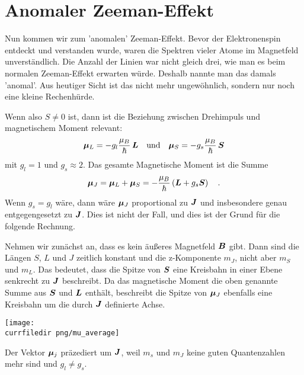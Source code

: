 \section{Anomaler Zeeman-Effekt}

Nun kommen wir zum 'anomalen' Zeeman-Effekt. Bevor der Elektronenspin entdeckt und verstanden wurde, waren die Spektren vieler Atome im Magnetfeld unverständlich. Die Anzahl der Linien war nicht gleich drei, wie man es beim normalen Zeeman-Effekt erwarten würde. Deshalb nannte man das damals 'anomal'. Aus heutiger Sicht ist das nicht mehr ungewöhnlich, sondern nur noch eine kleine Rechenhürde.

Wenn also $S \neq 0$ ist, dann ist die Beziehung zwischen Drehimpuls und magnetischem Moment relevant:
\begin{equation}
    \boldsymbol{\mu}_L = - g_l \frac{\mu_B}{\hbar} \, \boldsymbol{L} \quad \text{und} \quad  \boldsymbol{\mu}_S = - g_s \frac{\mu_B}{\hbar} \, \boldsymbol{S}
\end{equation}
mit $g_l = 1$ und $g_s \approx 2$. Das gesamte Magnetische Moment ist die Summe
\begin{equation}
    \boldsymbol{\mu}_J =  \boldsymbol{\mu}_L +  \boldsymbol{\mu}_S = - \frac{\mu_B}{\hbar} \left( \boldsymbol{L} + g_s \boldsymbol{S} \right)  \quad .
\end{equation}
Wenn $g_s = g_l$ wäre, dann wäre $\boldsymbol{\mu}_J$ proportional zu $\boldsymbol{J}$ und insbesondere genau entgegengesetzt zu $\boldsymbol{J}$. Dies ist nicht der Fall, und dies ist der Grund für die folgende Rechnung.

Nehmen wir zunächst an, dass es kein äußeres Magnetfeld $\boldsymbol{B}$ gibt. Dann sind die Längen $S$, $L$ und $J$ zeitlich konstant und die z-Komponente  $m_J$, nicht aber $m_S$ und $m_L$. Das bedeutet, dass die Spitze von $\boldsymbol{S}$ eine Kreisbahn in einer Ebene senkrecht zu $\boldsymbol{J}$ beschreibt. Da das magnetische Moment die oben genannte Summe aus $\boldsymbol{S}$ und $\boldsymbol{L}$ enthält, beschreibt die Spitze von $\boldsymbol{\mu}_J$ ebenfalls eine Kreisbahn um die durch $\boldsymbol{J}$ definierte Achse.

\begin{marginfigure}
    \texttt{[image: \\currfiledir png/mu\_average]}
\caption{Der Vektor $\boldsymbol{\mu}_j$ präzediert um $\boldsymbol{J}$, weil $m_s$ und $m_J$ keine guten Quantenzahlen mehr sind und $g_l \neq g_s$. }
\end{marginfigure}


